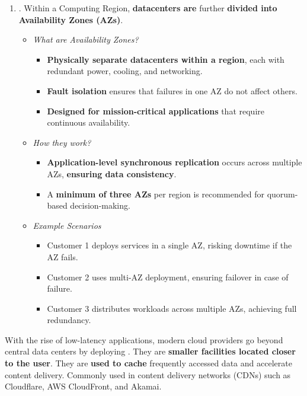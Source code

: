\begin{enumerate}
    \item {}. Within a Computing Region, \textbf{datacenters are} further \textbf{divided into Availability Zones (AZs)}.
    \begin{itemize}
        \item \emph{What are Availability Zones?}
        \begin{itemize}
            \item \textbf{Physically separate datacenters within a region}, each with redundant power, cooling, and networking.
            \item \textbf{Fault isolation} ensures that failures in one AZ do not affect others.
            \item \textbf{Designed for mission-critical applications} that require continuous availability.
        \end{itemize}
        \item \emph{How they work?}
        \begin{itemize}
            \item \textbf{Application-level synchronous replication} occurs across multiple AZs, \textbf{ensuring data consistency}.
            \item A \textbf{minimum of three AZs} per region is recommended for quorum-based decision-making.
        \end{itemize}
        \item \emph{Example Scenarios}
        \begin{itemize}
            \item Customer 1 deploys services in a single AZ, risking downtime if the AZ fails.
            \item Customer 2 uses multi-AZ deployment, ensuring failover in case of failure.
            \item Customer 3 distributes workloads across multiple AZs, achieving full redundancy.
        \end{itemize}
    \end{itemize}
\end{enumerate}
With the rise of low-latency applications, modern cloud providers go beyond central data centers by deploying . They are \textbf{smaller facilities located closer to the user}. They are \textbf{used to cache} frequently accessed data and accelerate content delivery. Commonly used in content delivery networks (CDNs) such as Cloudflare, AWS CloudFront, and Akamai.

